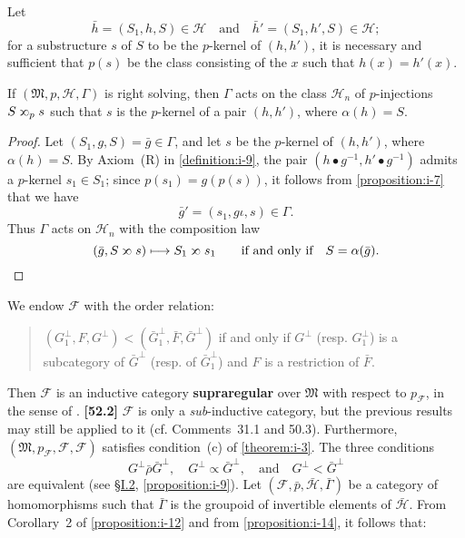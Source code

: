 \documentclass[a4paper,fleqn]{article}
\theoremstyle{plain}
\newenvironment{proposition}[1]
  {\renewcommand\theinnerproposition{#1}\innerproposition}
  {\endinnerproposition}
\theoremstyle{definition}
\newenvironment{longcomm}[1]
  {\noindent\textbf{[#1]}\rmfamily}
  {}
\newcommand{\unsure}[1]{{\color{purple}\textbf{#1}}}
\newcommand{\textand}{\quad\text{and}\quad}
\newcommand{\HH}{\mathcal{H}}
\newcommand{\bHH}{\bar{\HH}}
\newcommand{\MM}{\mathfrak{M}}
\newcommand{\FF}{\mathcal{F}}
\newcommand{\relrhobar}{\mathrel{\bar{\rho}}}
\newcommand{\subs}{\mathrel{\propto}}
\newcommand{\sups}{\mathrel{\reflectbox{$\propto$}}}
\begin{document}
Let
\[
  \bar{h} = (S_1,h,S)\in\HH
  \textand
  \bar{h}' = (S_1,h',S)\in\HH;
\]
for a substructure $s$ of $S$ to be the $p$-kernel of $(h,h')$, it is necessary and sufficient that $p(s)$ be the class consisting of the $x$ such that $h(x)=h'(x)$.

\begin{proposition}{16}
\label{proposition:i-16}
  If $(\MM,p,\HH,\Gamma)$ is right solving, then $\Gamma$ acts on the class $\HH_n$ of $p$-injections $S\sups_p s$ such that $s$ is the $p$-kernel of a pair $(h,h')$, where $\alpha(h)=S$.
\end{proposition}

\begin{proof}
  Let $(S_1,g,S)=\bar{g}\in\Gamma$, and let $s$ be the $p$-kernel of $(h,h')$, where $\alpha(h)=S$.
  By Axiom~(R) in \cref{definition:i-9}, the pair $(h\bullet g^{-1},h'\bullet g^{-1})$ admits a $p$-kernel $s_1\in S_1$;
  since $p(s_1)=g(p(s))$, it follows from \cref{proposition:i-7} that we have
  \[
    \bar{g}' = (s_1,g\iota,s)
    \in\Gamma.
  \]
  Thus $\Gamma$ acts on $\HH_n$ with the composition law
  \[
    (\bar{g},S\sups s)
    \longmapsto S_1\sups s_1
    \qquad\text{if and only if}\quad
    S=\alpha(\bar{g}).
    \qedhere
  \]
\end{proof}

We endow $\FF$ with the order relation:
\begin{quote}
  $(G_1^\perp,F,G^\perp)<(\bar{G}_1^\perp,\bar{F},\bar{G}^\perp)$
  \qquad if and only if\quad
  $G^\perp$ (resp. $G_1^\perp$) is a subcategory of $\bar{G}^\perp$ (resp. of $\bar{G}_1^\perp$) and $F$ is a restriction of $\bar{F}$.
\end{quote}

Then $\FF$ is an inductive category \unsure{supraregular} over $\MM$ with respect to $p_\FF$, in the sense of \cite{3c}.
\begin{longcomm}{52.2}
  $\FF$ is only a \emph{sub}-inductive category, but the previous results may still be applied to it (cf. Comments~31.1 and 50.3).
\end{longcomm}
Furthermore, $(\MM,p_\FF,\FF,\FF)$ satisfies condition~(c) of \cref{theorem:i-3}.
The three conditions
\[
  G^\perp\relrhobar\bar{G}^\perp,
  \quad G^\perp\subs\bar{G}^\perp,
  \textand G^\perp<\bar{G}^\perp
\]
are equivalent (see \hyperref[section:ii]{§I.2}, \cref{proposition:i-9}).
Let $(\FF,\bar{p},\bHH,\bar{\Gamma})$ be a category of homomorphisms such that $\bar{\Gamma}$ is the groupoid of invertible elements of $\bHH$.
From Corollary~2 of \cref{proposition:i-12} and from \cref{proposition:i-14}, it follows that:
\end{document}

